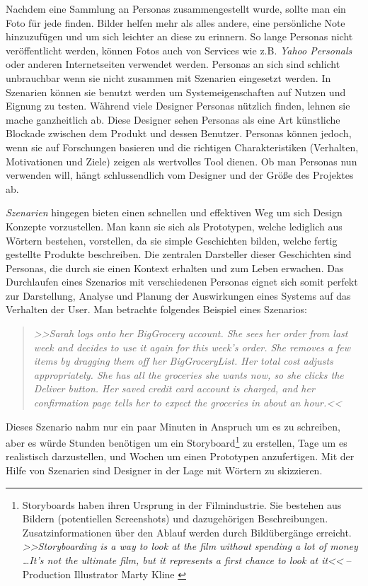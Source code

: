 \medskip Nachdem eine Sammlung an Personas zusammengestellt wurde, sollte man ein Foto für jede finden. Bilder helfen mehr als alles andere, eine persönliche Note hinzuzufügen und um sich leichter an diese zu erinnern. So lange Personas nicht veröffentlicht werden, können Fotos auch von Services wie z.B. \emph{Yahoo Personals} oder anderen Internetseiten verwendet werden. Personas an sich sind schlicht unbrauchbar wenn sie nicht zusammen mit Szenarien eingesetzt werden. In Szenarien können sie benutzt werden um Systemeigenschaften auf Nutzen und Eignung zu testen. 
Während viele Designer Personas nützlich finden, lehnen sie mache ganzheitlich ab. Diese Designer sehen Personas als eine Art künstliche Blockade zwischen dem Produkt und dessen Benutzer. Personas können jedoch, wenn sie auf Forschungen basieren und die richtigen Charakteristiken (Verhalten, Motivationen und Ziele) zeigen als wertvolles Tool dienen. Ob man Personas nun verwenden will, hängt schlussendlich vom Designer und der Größe des Projektes ab. \citep{Saffer:2007}

\medskip \emph{Szenarien} hingegen bieten einen schnellen und effektiven Weg um sich Design Konzepte vorzustellen. Man kann sie sich als Prototypen, welche lediglich aus Wörtern bestehen, vorstellen, da sie simple Geschichten bilden, welche fertig gestellte Produkte beschreiben. Die zentralen Darsteller dieser Geschichten sind Personas, die durch sie einen Kontext erhalten und zum Leben erwachen. Das Durchlaufen eines Szenarios mit verschiedenen Personas eignet sich somit perfekt zur Darstellung, Analyse und Planung der Auswirkungen eines Systems auf das Verhalten der User. Man betrachte folgendes Beispiel eines Szenarios:

\begin{quote}
	\textsl{>>Sarah logs onto her BigGrocery account. She sees her order from last week and decides to use it again for this week's order. She removes a few items by dragging them off her BigGroceryList. Her total cost adjusts appropriately. She has all the groceries she wants now, so she clicks the Deliver button. Her saved credit card account is charged, and her confirmation page tells her to expect the groceries in about an hour.<<}
	 \begin{flushright} \citep{Saffer:2007} \end{flushright}
\end{quote}

Dieses Szenario nahm nur ein paar Minuten in Anspruch um es zu schreiben, aber es würde Stunden benötigen um ein Storyboard\footnote{Storyboards haben ihren Ursprung in der Filmindustrie. Sie bestehen aus Bildern (potentiellen Screenshots) und dazugehörigen Beschreibungen. Zusatzinformationen über den Ablauf werden durch Bildübergänge  erreicht. \emph{>>Storyboarding is a way to look at the film without spending a lot of money \ldots It’s not the ultimate film, but it represents a first chance to look at it<<} -- Production Illustrator Marty Kline \citep{Braa:1989}}  zu erstellen, Tage um es realistisch darzustellen, und Wochen um einen Prototypen anzufertigen. Mit der Hilfe von Szenarien sind Designer in der Lage mit Wörtern zu skizzieren. \citep{Saffer:2007} 

